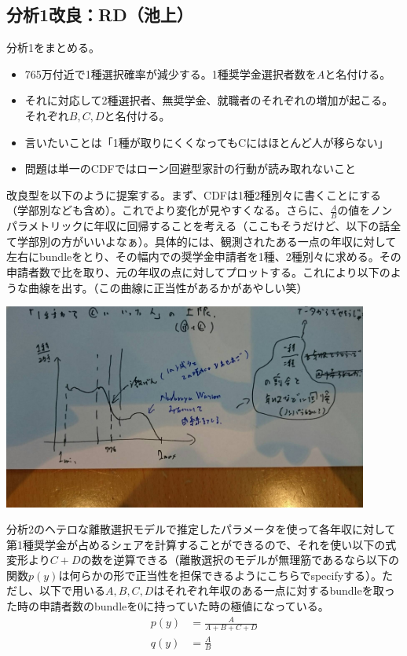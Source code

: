 \documentclass{jsarticle}
\begin{document}
	\subsection{分析1改良：RD（池上）}
	分析1をまとめる。
	\begin{itemize}
	\item 765万付近で1種選択確率が減少する。1種奨学金選択者数を$A$と名付ける。
	\item それに対応して2種選択者、無奨学金、就職者のそれぞれの増加が起こる。それぞれ$B,C,D$と名付ける。
	\item 言いたいことは「1種が取りにくくなってもCにはほとんど人が移らない」
	\item 問題は単一のCDFではローン回避型家計の行動が読み取れないこと
	\end{itemize}
	改良型を以下のように提案する。まず、CDFは1種2種別々に書くことにする（学部別なども含め）。これでより変化が見やすくなる。さらに、$\frac{A}{B}$の値をノンパラメトリックに年収に回帰することを考える（ここもそうだけど、以下の話全て学部別の方がいいよなぁ）。具体的には、観測されたある一点の年収に対して左右にbundleをとり、その幅内での奨学金申請者を1種、2種別々に求める。その申請者数で比を取り、元の年収の点に対してプロットする。これにより以下のような曲線を出す。（この曲線に正当性があるかがあやしい笑）
	\par
	\includegraphics[width = 12cm]{figure1.jpg}
	\par
	分析2のヘテロな離散選択モデルで推定したパラメータを使って各年収に対して第1種奨学金が占めるシェアを計算することができるので、それを使い以下の式変形より$C+D$の数を逆算できる（離散選択のモデルが無理筋であるなら以下の関数$p(y)$は何らかの形で正当性を担保できるようにこちらでspecifyする）。ただし、以下で用いる$A,B,C,D$はそれぞれ年収のある一点に対するbundleを取った時の申請者数のbundleを0に持っていた時の極値になっている。
	\begin{align*}
		p(y) &= \frac{A}{A+B+C+D}\\[10pt]
		q(y) &= \frac{A}{B}
	\end{align*}
\end{document}
